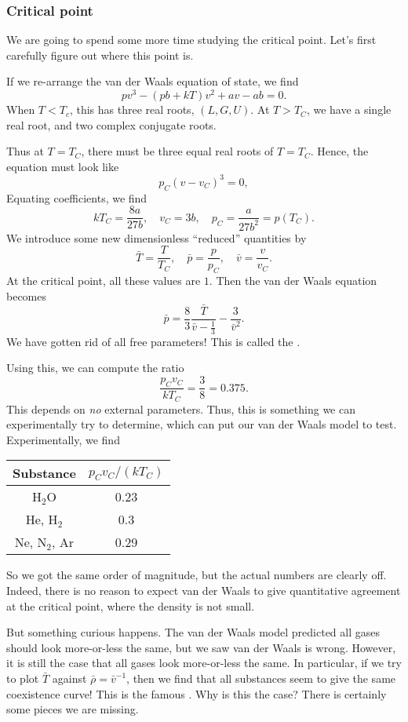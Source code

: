 \documentclass[a4paper]{article}
\begin{document}
\subsubsection*{Critical point}
We are going to spend some more time studying the critical point. Let's first carefully figure out where this point is.

If we re-arrange the van der Waals equation of state, we find
\[
  pv^3 - (pb + kT) v^2 + av - ab = 0.\tag{$*$}
\]
When $T < T_c$, this has three real roots, $(L, G, U)$. At $T > T_C$, we have a single real root, and two complex conjugate roots.

Thus at $T = T_C$, there must be three equal real roots of $T = T_C$. Hence, the equation must look like
\[
  p_C(v - v_C)^3 = 0,
\]
Equating coefficients, we find
\[
  k T_C = \frac{8a}{27 b},\quad v_C = 3b,\quad p_C = \frac{a}{27 b^2} = p(T_C).
\]
We introduce some new dimensionless ``reduced'' quantities by
\[
  \bar{T} = \frac{T}{T_C},\quad \bar{p} = \frac{p}{p_C},\quad \bar{v} = \frac{v}{v_C}.
\]
At the critical point, all these values are $1$. Then the van der Waals equation becomes
\[
  \bar{p} = \frac{8}{3} \frac{\bar{T}}{\bar{v} - \frac{1}{3}} - \frac{3}{\bar{v}^2}.
\]
We have gotten rid of all free parameters! This is called the .

Using this, we can compute the ratio
\[
  \frac{p_C v_C}{k T_C} = \frac{3}{8} = 0.375.
\]
This depends on \emph{no} external parameters. Thus, this is something we can experimentally try to determine, which can put our van der Waals model to test. Experimentally, we find
\begin{center}
  \begin{tabular}{cc}
    \toprule
    Substance & $p_C v_C/(kT_C)$\\
    \midrule
    H$_2$O & 0.23\\
    He, H$_2$ & 0.3\\
    Ne, N$_2$, Ar & 0.29\\
    \bottomrule
  \end{tabular}
\end{center}
So we got the same order of magnitude, but the actual numbers are clearly off. Indeed, there is no reason to expect van der Waals to give quantitative agreement at the critical point, where the density is not small.

But something curious happens. The van der Waals model predicted all gases should look more-or-less the same, but we saw van der Waals is wrong. However, it is still the case that all gases look more-or-less the same. In particular, if we try to plot $\bar{T}$ against $\bar{\rho} = \bar{v}^{-1}$, then we find that all substances seem to give the same coexistence curve! This is the famous . Why is this the case? There is certainly some pieces we are missing.
\end{document}
